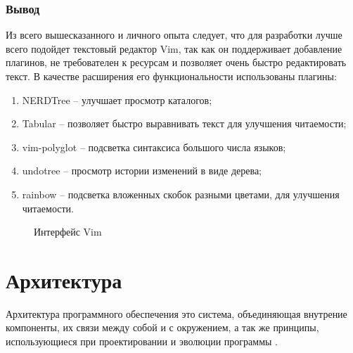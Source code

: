 \subsubsection{Вывод}\label{sec:ch2/sec1/sub1/sub4}
Из всего вышесказанного и личного опыта следует, 
что для разработки {\ProgModule} лучше всего подойдет текстовый редактор Vim,
так как он поддерживает добавление плагинов, не требователен к ресурсам и позволяет
очень быстро редактировать текст. В качестве расширения его функциональности использованы
плагины:
\begin{enumerate}[label={\arabic*)}]
    \item NERDTree \autocite{nerdtree} -- улучшает просмотр каталогов;
    \item Tabular \autocite{tabular} -- позволяет быстро выравнивать текст
        для улучшения читаемости;
    \item vim-polyglot \autocite{vim-polyglot} -- подсветка синтаксиса большого
        числа языков;
    \item undotree \autocite{undotree} -- просмотр истории изменений в виде дерева;
    \item rainbow \autocite{rainbow} -- подсветка вложенных скобок разными цветами,
        для улучшения читаемости.
\end{enumerate}


\begin{figure}[!htbp]
    \caption{Интерфейс Vim {\ProgModule}\label{fig:vim-tui}}
\end{figure}

\section{Архитектура {\ProgModule}}\label{sec:ch2/sec2}
Архитектура программного обеспечения это система, объединяющая внутрение
компоненты, их связи между собой и с окружением, а так же принципы,
использующиеся при проектировании и эволюции программы \autocite{software-architecture}.

